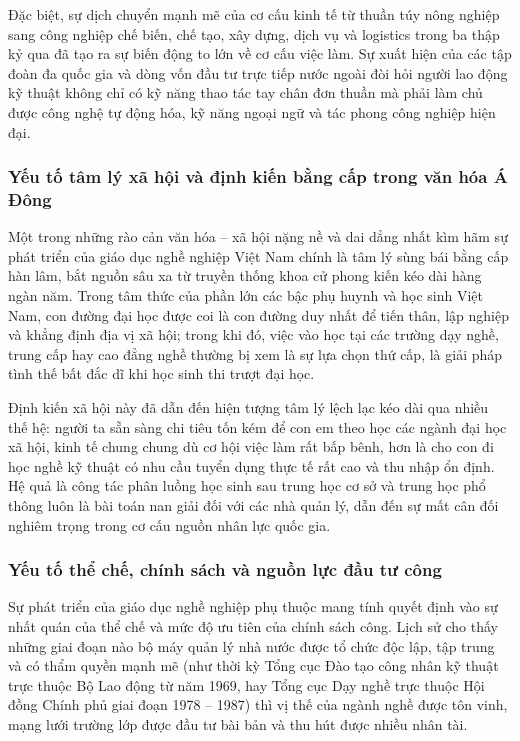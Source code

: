 Đặc biệt, sự dịch chuyển mạnh mẽ của cơ cấu kinh tế từ thuần túy nông nghiệp sang công nghiệp chế biến, chế tạo, xây dựng, dịch vụ và logistics trong ba thập kỷ qua đã tạo ra sự biến động to lớn về cơ cấu việc làm. Sự xuất hiện của các tập đoàn đa quốc gia và dòng vốn đầu tư trực tiếp nước ngoài đòi hỏi người lao động kỹ thuật không chỉ có kỹ năng thao tác tay chân đơn thuần mà phải làm chủ được công nghệ tự động hóa, kỹ năng ngoại ngữ và tác phong công nghiệp hiện đại.

\subsubsection{Yếu tố tâm lý xã hội và định kiến bằng cấp trong văn hóa Á Đông}

Một trong những rào cản văn hóa -- xã hội nặng nề và dai dẳng nhất kìm hãm sự phát triển của giáo dục nghề nghiệp Việt Nam chính là tâm lý sùng bái bằng cấp hàn lâm, bắt nguồn sâu xa từ truyền thống khoa cử phong kiến kéo dài hàng ngàn năm. Trong tâm thức của phần lớn các bậc phụ huynh và học sinh Việt Nam, con đường đại học được coi là con đường duy nhất để tiến thân, lập nghiệp và khẳng định địa vị xã hội; trong khi đó, việc vào học tại các trường dạy nghề, trung cấp hay cao đẳng nghề thường bị xem là sự lựa chọn thứ cấp, là giải pháp tình thế bất đắc dĩ khi học sinh thi trượt đại học.

Định kiến xã hội này đã dẫn đến hiện tượng tâm lý lệch lạc kéo dài qua nhiều thế hệ: người ta sẵn sàng chi tiêu tốn kém để con em theo học các ngành đại học xã hội, kinh tế chung chung dù cơ hội việc làm rất bấp bênh, hơn là cho con đi học nghề kỹ thuật có nhu cầu tuyển dụng thực tế rất cao và thu nhập ổn định. Hệ quả là công tác phân luồng học sinh sau trung học cơ sở và trung học phổ thông luôn là bài toán nan giải đối với các nhà quản lý, dẫn đến sự mất cân đối nghiêm trọng trong cơ cấu nguồn nhân lực quốc gia.

\subsubsection{Yếu tố thể chế, chính sách và nguồn lực đầu tư công}

Sự phát triển của giáo dục nghề nghiệp phụ thuộc mang tính quyết định vào sự nhất quán của thể chế và mức độ ưu tiên của chính sách công. Lịch sử cho thấy những giai đoạn nào bộ máy quản lý nhà nước được tổ chức độc lập, tập trung và có thẩm quyền mạnh mẽ (như thời kỳ Tổng cục Đào tạo công nhân kỹ thuật trực thuộc Bộ Lao động từ năm 1969, hay Tổng cục Dạy nghề trực thuộc Hội đồng Chính phủ giai đoạn 1978 -- 1987) thì vị thế của ngành nghề được tôn vinh, mạng lưới trường lớp được đầu tư bài bản và thu hút được nhiều nhân tài. 

